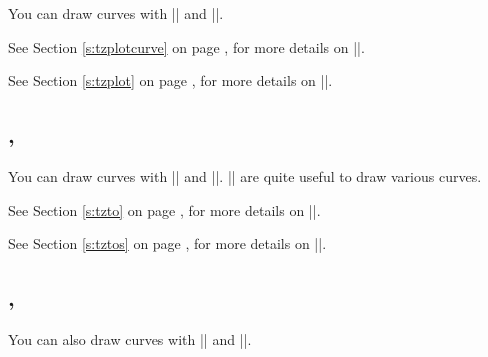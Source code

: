 You can draw curves with |\tzplotcurve| and |\tzplot|.

\begin{tzcode}{.3}
\end{tzcode}


See Section \ref{s:tzplotcurve} on page \pageref{s:tzplotcurve}, for more details on |\tzplotcurve|.

See Section \ref{s:tzplot} on page \pageref{s:tzplot}, for more details on |\tzplot|.


\subsection{\protect\cmd{\tzto}, \protect\cmd{\tztos}}
\label{ss:curves:tzto}

You can draw curves with |\tzto| and |\tztos|.
|\tztos| are quite useful to draw various curves.

\begin{tzcode}{.3}
{}
\end{tzcode}

See Section \ref{s:tzto} on page \pageref{s:tzto}, for more details on |\tzto|.

See Section \ref{s:tztos} on page \pageref{s:tztos}, for more details on |\tztos|.

\subsection{\protect\cmd{\tzlink}, \protect\cmd{\tzlinks}}
\label{ss:curves:tzlink}

You can also draw curves with |\tzlink| and |\tzlinks|.

\begin{tzcode}{.3}
{}
\end{tzcode}

